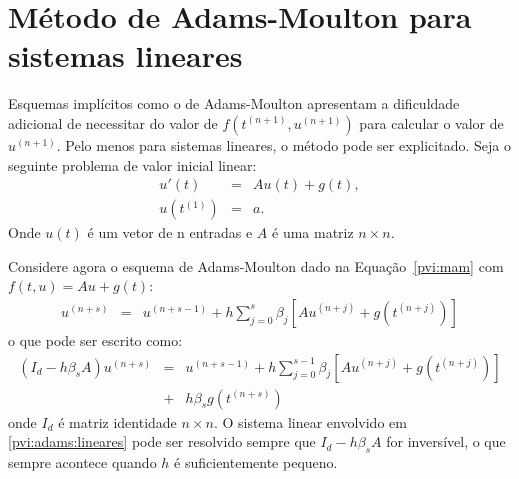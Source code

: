 % 
% 
% 
% 
% 
% 

\section{Método de Adams-Moulton para sistemas lineares}
Esquemas implícitos como o de Adams-Moulton apresentam a dificuldade adicional de necessitar do valor de $f(t^{(n+1)},u^{(n+1)})$ para calcular o valor de $u^{(n+1)}$. Pelo menos para sistemas lineares, o método pode ser explicitado. Seja o seguinte problema de valor inicial linear:
\begin{eqnarray*}
 u'(t)&=& Au(t) + g(t),\\
 u(t^{(1)}) &=& a.
\end{eqnarray*}
Onde $u(t)$ é um vetor de n entradas e $A$ é uma matriz $n\times n$.

Considere agora o esquema de Adams-Moulton dado na Equação~\eqref{pvi:mam} com $f(t,u)=Au+g(t)$:
\begin{eqnarray*}
  u^{(n+s)}  &=& u^{(n+s-1)}  + h\sum_{j=0}^{s}\beta_j \left[Au^{(n+j)} + g(t^{(n+j)})\right]
\end{eqnarray*}
o que pode ser escrito como:
\begin{eqnarray}\label{pvi:adams:lineares}
  \left(I_d-h\beta_s A\right)u^{(n+s)}  &=& u^{(n+s-1)}  + h\sum_{j=0}^{s-1}\beta_j \left[Au^{(n+j)}+ g(t^{(n+j)})\right]\nonumber\\
  &+& h\beta_s g(t^{(n+s)}) 
\end{eqnarray}
onde $I_d$ é matriz identidade $n\times n$. O sistema linear envolvido em \ref{pvi:adams:lineares} pode ser resolvido sempre que $I_d-h\beta_s A$ for inversível, o que sempre acontece quando $h$ é suficientemente pequeno.



